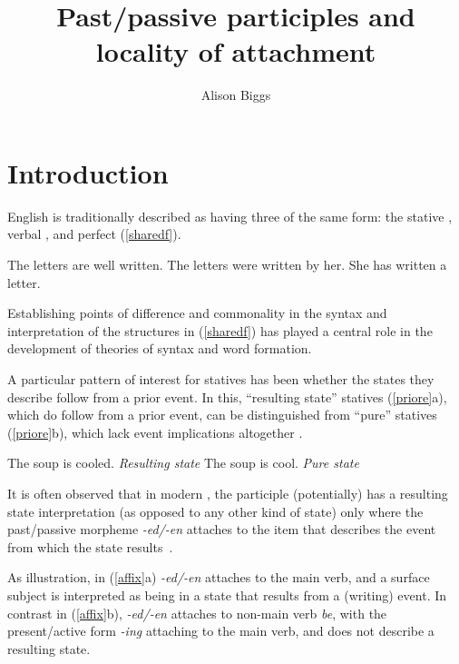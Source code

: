 \documentclass[output=paper,modfonts,nonflat]{langsci/langscibook}
\title{Past/passive participles and locality of attachment}
\author{Alison Biggs\affiliation{Georgetown University}}
\begin{document}
\glsresetall

\maketitle

\section{Introduction}

English is traditionally described as having three  of the same
form: the stative , verbal , and perfect (\ref{sharedf}).

\begin{exe}
\ex\label{sharedf}
    \begin{xlist}
    \ex The letters are well written.
    \ex The letters were written by her.
    \ex She has written a letter.
    \end{xlist}
\end{exe}

Establishing points of difference and commonality in the syntax and
interpretation of the structures in (\ref{sharedf}) has played a central role
in the development of theories of syntax and word formation.

A particular pattern of interest for statives has been whether the states they
describe follow from a prior event. In this, \enquote{resulting state} statives
(\ref{priore}a), which do follow from a prior event, can be distinguished from
\enquote{pure} statives (\ref{priore}b), which lack event implications altogether
\citep{Parsons1990a, Embick2004a}.

\begin{exe}
\ex\label{priore}
    \begin{xlist}
    \ex The soup is cooled. \hfill \emph{Resulting state}
    \ex The soup is cool. \hfill \emph{Pure state}
    \end{xlist}
\end{exe}

It is often observed that in modern , the participle (potentially)
has a resulting state interpretation (as opposed to any other kind of state)
only where the past/passive morpheme \emph{-ed/-en} attaches to the item that
describes the event from which the state results~\citep[e.g.\ ][]{Parsons1990a,
Kratzer2001a, Alexiadou2008a, AlexiadouEtAl2015}.

As illustration, in (\ref{affix}a) \emph{-ed/-en} attaches to the main verb,
and a surface subject is interpreted as being in a state that results from a
(writing) event. In  contrast in (\ref{affix}b), \emph{-ed/-en} attaches to
non-main verb \emph{be}, with the present/active form \emph{-ing} attaching to
the main verb, and does not describe a resulting state.
\end{document}
